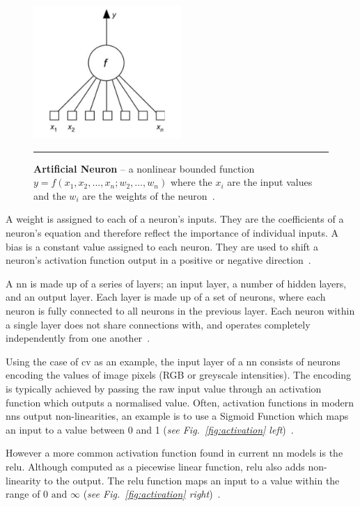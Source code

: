 \begin{figure}[H]
    \centering
        \includegraphics[width=0.5\textwidth]{media/literature/artificial-neuron1.png}
        \rule{35em}{0.5pt}
        \caption[Example of an artifcial neuron]{\textbf{Artificial Neuron} -- a nonlinear bounded function $y = f(x_{1}, x_{2},\ldots,x_{n};w_{2},\ldots,w_{n})$ where the ${x_{i}}$ are the input values and the  ${w_{i}}$ are the weights of the neuron~\citep{Dreyfus2005}.}\label{fig:an}
\end{figure}


A weight is assigned to each of a neuron's inputs. They are the coefficients of a neuron's equation and therefore reflect the importance of individual inputs. A bias is a constant value assigned to each neuron. They are used to shift a neuron's activation function output in a positive or negative direction~\citep{Malik2019weights}.

A \Gls{nn} is made up of a series of layers; an input layer,
a number of hidden layers, and an output layer. Each layer is
made up of a set of neurons, where each neuron is fully connected
to all neurons in the previous layer. Each neuron within a single layer
does not share connections with, and operates completely independently from one another~\citep{cs231n}.


Using the case of \Gls{cv} as an example, 
the input layer of a \Gls{nn} consists of
neurons encoding the values of image pixels (RGB or greyscale intensities).
The encoding is typically achieved by passing the raw input 
value through an activation function which outputs a normalised value. 
Often, activation functions in modern \Glspl{nn} output non-linearities, 
an example is to use a Sigmoid Function which maps an input to a value between 0 and 1 
(\textit{see Fig.~\ref{fig:activation} \textit{left}})~\citep{Nielsen2015}.

However a more common activation function found in current \gls{nn} models is the \gls{relu}.
Although computed as a piecewise linear function, \gls{relu} also adds non-linearity to the output. The \gls{relu} function maps an input to a value
within the range of $0 \text{ and } \infty$ (\textit{see Fig.~\ref{fig:activation} \textit{right}})~\citep{Malik2019activation}.

